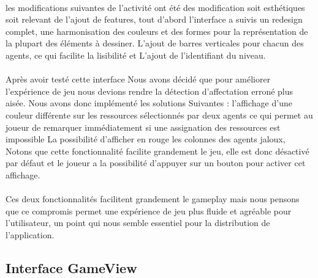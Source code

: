 \documentclass[a4paper, 10pt]{article}
\begin{document}
\paragraph{}
les modifications suivantes de l’activité ont été des modification soit esthétiques soit relevant de l’ajout de features, tout d’abord l’interface a suivis un redesign complet, une harmonisation des couleurs et des formes pour la représentation de la plupart des éléments à dessiner. L’ajout de barres verticales pour chacun des agents, ce qui facilite la lisibilité et  L’ajout de l’identifiant du niveau.
\paragraph{}
    Après avoir testé cette interface Nous avons décidé que pour améliorer l'expérience de jeu nous devions rendre la détection d’affectation erroné plus aisée. Nous avons donc implémenté les solutions Suivantes :
 l’affichage d’une couleur différente sur les ressources sélectionnés par deux agents ce qui permet au joueur de remarquer immédiatement si une assignation des ressources est impossible
La possibilité d’afficher en rouge les colonnes des agents jaloux, Notons que cette fonctionnalité facilite grandement le jeu, elle est donc désactivé par défaut et le joueur a la possibilité d’appuyer sur un bouton pour activer cet affichage.
\paragraph{}
    Ces deux fonctionnalités facilitent grandement le gameplay mais nous pensons que ce compromis permet une expérience de jeu plus fluide et agréable pour l’utilisateur, un point qui nous semble essentiel pour la distribution de l’application. 


	\subsection{Interface GameView}
	
\end{document}
